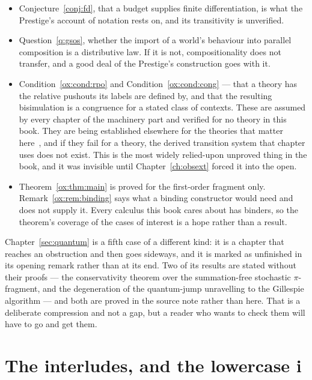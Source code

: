 \begin{itemize}[leftmargin=1.6em, itemsep=4pt]
\item Conjecture~\ref{conj:fd}, that a budget supplies finite
      differentiation, is what the Prestige's account of notation
      rests on, and its transitivity is unverified.
\item Question~\ref{q:gsos}, whether the import of a world's
      behaviour into parallel composition is a distributive law.
      If it is not, compositionality does not transfer, and a
      good deal of the Prestige's construction goes with it.
\item Condition~\ref{ox:cond:rpo} and Condition~\ref{ox:cond:cong}
      --- that a theory has the relative pushouts its labels are
      defined by, and that the resulting bisimulation is a
      congruence for a stated class of contexts.
      These are assumed by every chapter of the machinery part and
      verified for no theory in this book.
      They are being established elsewhere for the theories that
      matter here~\cite{BIHOL}, and if they fail for a theory, the
      derived transition system that chapter uses does not exist.
      This is the most widely relied-upon unproved thing in the
      book, and it was invisible until Chapter~\ref{ch:obsext}
      forced it into the open.
\item Theorem~\ref{ox:thm:main} is proved for the first-order
      fragment only.
      Remark~\ref{ox:rem:binding} says what a binding constructor
      would need and does not supply it.
      Every calculus this book cares about has binders, so the
      theorem's coverage of the cases of interest is a hope rather
      than a result.
\end{itemize}

\noindent
Chapter~\ref{sec:quantum} is a fifth case of a different kind: it
is a chapter that reaches an obstruction and then goes sideways,
and it is marked as unfinished in its opening remark rather than at
its end.
Two of its results are stated without their proofs --- the
conservativity theorem over the summation-free stochastic
$\pi$-fragment, and the degeneration of the quantum-jump
unravelling to the Gillespie algorithm --- and both are proved in
the source note rather than here.
That is a deliberate compression and not a gap, but a reader who
wants to check them will have to go and get them.

\section*{The interludes, and the lowercase i}


